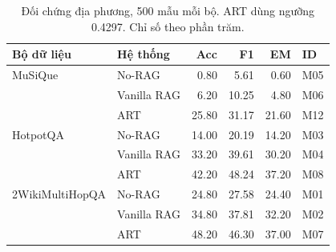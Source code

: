 \begin{table}[htbp]\centering\small
\caption{Đối chứng địa phương, 500 mẫu mỗi bộ. ART dùng ngưỡng 0.4297. Chỉ số theo phần trăm.}
\label{tab:local}
\begin{tabular}{@{}llrrrl@{}}
\toprule
Bộ dữ liệu & Hệ thống & Acc & F1 & EM & ID \\
\midrule
MuSiQue & No-RAG & 0.80 & 5.61 & 0.60 & M05 \\
 & Vanilla RAG & 6.20 & 10.25 & 4.80 & M06 \\
 & ART & 25.80 & 31.17 & 21.60 & M12 \\
HotpotQA & No-RAG & 14.00 & 20.19 & 14.20 & M03 \\
 & Vanilla RAG & 33.20 & 39.61 & 30.20 & M04 \\
 & ART & 42.20 & 48.24 & 37.20 & M08 \\
2WikiMultiHopQA & No-RAG & 24.80 & 27.58 & 24.40 & M01 \\
 & Vanilla RAG & 34.80 & 37.81 & 32.20 & M02 \\
 & ART & 48.20 & 46.30 & 37.00 & M07 \\
\bottomrule
\end{tabular}
\end{table}
